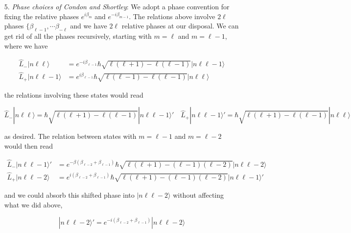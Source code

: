 \begin{itemize}
  \item[5.] \textit{Phase choices of Condon and Shortley}: We adopt a phase
    convention for fixing the relative phases $e^{i\beta_{m}}$ and
    $e^{-i\beta_{m-1}}$. The relations above involve  $2\ell$ phases $\{
      \beta_{\ell - 1}, \cdots \beta_{-\ell}$ and we have $2\ell$ relative
      phases at our disposal. We can get rid of all the phases recursively,
      starting with $m = \ell$ and $m = \ell - 1$, where we have 

      \begin{align} \label{}
        \hat{L}_- |n \ell \ell \rangle &= e^{-i\beta_{\ell - 1}}\hbar
        \sqrt{\ell(\ell+1) - \ell(\ell-1)} | n \ell \ell - 1 \rangle \\
        \hat{L}_+|n \ell \ell - 1 \rangle &= e^{i\beta_{\ell - 1}}\hbar
        \sqrt{\ell ( \ell - 1 ) - \ell ( \ell - 1 )} | n \ell \ell \rangle
      \end{align}\vspace{3px}
    
      the relations involving these states would read 

      \[
      \hat{L}_- | n \ell \ell \rangle = \hbar \sqrt{\ell(\ell+1)
      - \ell(\ell-1)} | n \ell \ell - 1 \rangle' \quad \hat{L}_+ | n \ell \ell
      - 1 \rangle' = \hbar \sqrt{\ell(\ell+1) - \ell(\ell - 1)}|n \ell \ell
      \rangle
      \] \vspace{3px}
      
      as desired. The relation between states with $m = \ell - 1$ and $m = \ell
      - 2$ would then read 

      \begin{align} \label{}
        \hat{L}_- |n \ell \ell - 1\rangle' &= e^{-\beta(\beta_{\ell - 2}
        + \beta_{\ell - 1} )} \hbar \sqrt{\ell(\ell + 1) - (\ell - 1)(\ell
          - 2)}|n \ell \ell - 2 \rangle \\ \hat{L}_+|n \ell \ell - 2\rangle
                                           &= e^{i(\beta_{\ell - 2}
                                           + \beta_{\ell - 1})} \hbar \sqrt{\ell(\ell + 1)
        - (\ell - 1)(\ell - 2)}|n \ell \ell - 1 \rangle'
      \end{align}\vspace{3px}
      
    and we could absorb this shifted phase into $|n \ell \ell - 2\rangle$
    without affecting what we did above, 

    \[
      |n \ell \ell- 2\rangle' = e^{-i (\beta_{\ell - 2} + \beta_{\ell - 1})} |n
      \ell \ell - 2\rangle
    \] \vspace{3px}
    

\end{itemize}
